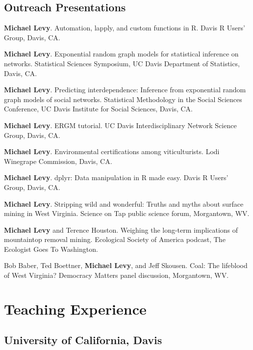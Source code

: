 \subsection{Outreach Presentations}\label{outreach-presentations}

\begin{description}
\tightlist
\item[2016]
\textbf{Michael Levy}. Automation, lapply, and custom functions in R.
Davis R Users' Group, Davis, CA.
\item[2015]
\textbf{Michael Levy}. Exponential random graph models for statistical
inference on networks. Statistical Sciences Symposium, UC Davis
Department of Statistics, Davis, CA.
\item[2015]
\textbf{Michael Levy}. Predicting interdependence: Inference from
exponential random graph models of social networks. Statistical
Methodology in the Social Sciences Conference, UC Davis Institute for
Social Sciences, Davis, CA.
\item[2015]
\textbf{Michael Levy}. ERGM tutorial. UC Davis Interdisciplinary Network
Science Group, Davis, CA.
\item[2014]
\textbf{Michael Levy}. Environmental certifications among
viticulturists. Lodi Winegrape Commission, Davis, CA.
\item[2014]
\textbf{Michael Levy}. dplyr: Data manipulation in R made easy. Davis R
Users' Group, Davis, CA.
\item[2012]
\textbf{Michael Levy}. Stripping wild and wonderful: Truths and myths
about surface mining in West Virginia. Science on Tap public science
forum, Morgantown, WV.
\item[2011]
\textbf{Michael Levy} and Terence Houston. Weighing the long-term
implications of mountaintop removal mining. Ecological Society of
America podcast, The Ecologist Goes To Washington.
\item[2011]
Bob Baber, Ted Boettner, \textbf{Michael Levy}, and Jeff Skousen. Coal:
The lifeblood of West Virginia? Democracy Matters panel discussion,
Morgantown, WV.
\end{description}

\section{Teaching Experience}\label{teaching-experience}

\subsection{University of California,
Davis}\label{university-of-california-davis}

